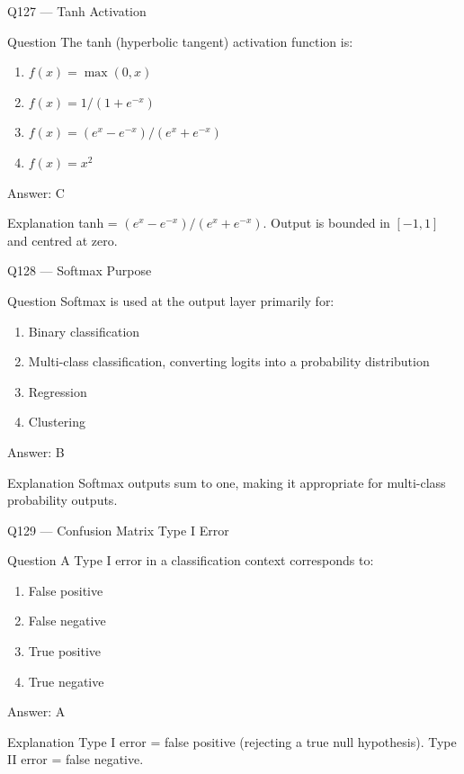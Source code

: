 \documentclass[aspectratio=169,8pt]{beamer}
\begin{document}
	\begin{frame}{Q127 --- Tanh Activation}
		\begin{block}{Question}
			The tanh (hyperbolic tangent) activation function is:
			\begin{enumerate}
				\item $f(x) = \max(0, x)$
				\item $f(x) = 1/(1+e^{-x})$
				\item $f(x) = (e^x - e^{-x})/(e^x + e^{-x})$
				\item $f(x) = x^2$
			\end{enumerate}
		\end{block}
		\begin{exampleblock}{Answer: C}\end{exampleblock}
		\begin{block}{Explanation}
			tanh = $(e^x - e^{-x})/(e^x + e^{-x})$. Output is bounded in $[-1, 1]$ and centred at zero.
		\end{block}
	\end{frame}
	
	\begin{frame}{Q128 --- Softmax Purpose}
		\begin{block}{Question}
			Softmax is used at the output layer primarily for:
			\begin{enumerate}
				\item Binary classification
				\item Multi-class classification, converting logits into a probability distribution
				\item Regression
				\item Clustering
			\end{enumerate}
		\end{block}
		\begin{exampleblock}{Answer: B}\end{exampleblock}
		\begin{block}{Explanation}
			Softmax outputs sum to one, making it appropriate for multi-class probability outputs.
		\end{block}
	\end{frame}
	
	\begin{frame}{Q129 --- Confusion Matrix Type I Error}
		\begin{block}{Question}
			A Type I error in a classification context corresponds to:
			\begin{enumerate}
				\item False positive
				\item False negative
				\item True positive
				\item True negative
			\end{enumerate}
		\end{block}
		\begin{exampleblock}{Answer: A}\end{exampleblock}
		\begin{block}{Explanation}
			Type I error = false positive (rejecting a true null hypothesis). Type II error = false negative.
		\end{block}
	\end{frame}
	
\end{document}
